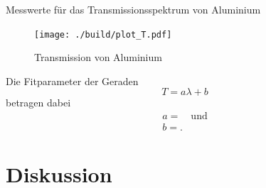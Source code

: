 \begin{table}[H]
    \centering
    
    \caption{Messwerte für das Transmissionsspektrum von Aluminium}
    \label{tab:2}
\end{table}




\begin{figure}[H]
    \centering
    \texttt{[image: ./build/plot\_T.pdf]}
    \caption{Transmission von Aluminium}
    \label{fig:b}
\end{figure}

Die Fitparameter der Geraden
\begin{equation}
T=a \lambda +b
\end{equation}
betragen dabei
\begin{align}
    a = \text{}\quad \text{und}\\
    b = \text{}.
\end{align}


\section{Diskussion}



\newpage
\printbibliography

